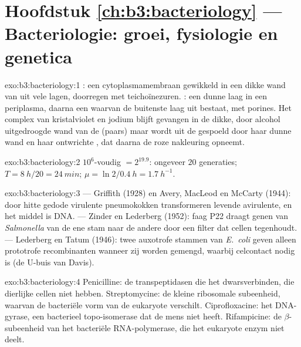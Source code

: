 \section*{Hoofdstuk \ref{ch:b3:bacteriology} --- Bacteriologie: groei, fysiologie en genetica}

\begin{solution}{exo:b3:bacteriology:1}
: een cytoplasmamembraan gewikkeld in een dikke wand van
 uit vele lagen, doorregen met teichoïnezuren.
: een dunne laag  in een periplasma, daarna
een  waarvan de buitenste laag uit 
bestaat, met porines. Het complex van kristalviolet en jodium blijft
gevangen in de dikke, door alcohol uitgedroogde wand van de
 (paars) maar wordt uit de  gespoeld door
haar dunne wand en haar ontwrichte , dat daarna de roze
nakleuring opneemt.
\end{solution}

\begin{solution}{exo:b3:bacteriology:2}
$10^{6}$-voudig $= 2^{19.9}$: ongeveer $20$ generaties; $T = \qty{8}{h}/20
= \qty{24}{min}$; $\mu = \ln 2/\qty{0.4}{h} = \qty{1.7}{h^{-1}}$.
\end{solution}

\begin{solution}{exo:b3:bacteriology:3}
 --- Griffith (1928) en Avery, MacLeod en McCarty (1944):
door hitte gedode virulente pneumokokken transformeren levende
avirulente, en het middel is DNA.  --- Zinder en Lederberg
(1952): faag P22 draagt genen van \emph{Salmonella} van de ene stam
naar de andere door een filter dat cellen tegenhoudt.  ---
Lederberg en Tatum (1946): twee auxotrofe stammen van \emph{E.~coli}
geven alleen prototrofe recombinanten wanneer zij worden gemengd,
waarbij celcontact nodig is (de U-buis van Davis).
\end{solution}

\begin{solution}{exo:b3:bacteriology:4}
Penicilline: de transpeptidasen die het  dwarsverbinden,
die dierlijke cellen niet hebben. Streptomycine: de kleine ribosomale
subeenheid, waarvan de bacteriële vorm van de eukaryote verschilt.
Ciprofloxacine: het DNA-gyrase, een bacterieel topo-isomerase dat de
mens niet heeft. Rifampicine: de $\beta$-subeenheid van het bacteriële
RNA-polymerase, die het eukaryote enzym niet deelt.
\end{solution}

